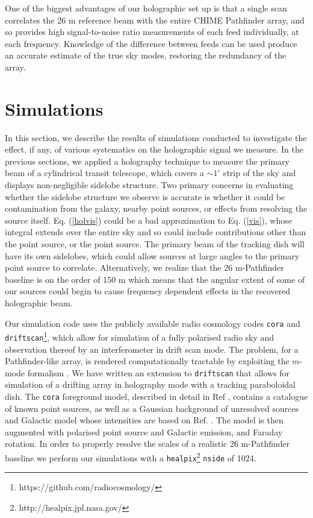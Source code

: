 One of the biggest advantages of our holographic set up is that a single scan correlates the 26 m reference beam with the entire CHIME Pathfinder array, and so provides high signal-to-noise ratio measurements of each feed individually, at each frequency. Knowledge of the difference between feeds can be used produce an accurate estimate of the true sky modes, restoring the redundancy of the array. 

\section{Simulations} \label{sec4}

In this section, we describe the results of simulations conducted to investigate the effect, if any, of various systematics on the holographic signal we measure. In the previous sections, we applied a holography technique to measure the primary beam of a cylindrical transit telescope, which covers a $\sim 1^{\circ}$ strip of the sky and displays non-negligible sidelobe structure. Two primary concerns in evaluating whether the sidelobe structure we observe is accurate is whether it could be contamination from the galaxy, nearby point sources, or effects from resolving the source itself. Eq. (\ref{holvis}) could be a bad approximation to Eq. (\ref{vis}), whose integral extends over the entire sky and so could include contributions other than the point source, or the point source. The primary beam of the tracking dish will have its own sidelobes, which could allow sources at large angles to the primary point source to correlate. Alternatively, we realize that the 26 m-Pathfinder baseline is on the order of 150 m which means that the angular extent of some of our sources could begin to cause frequency dependent effects in the recovered holographic beam. 

Our simulation code uses the publicly available radio cosmology codes \texttt{cora} and \texttt{driftscan}\footnote{https://github.com/radiocosmology/}, which allow for simulation of a fully polarised radio sky and observation thereof by an interferometer in drift scan mode. The problem, for a Pathfinder-like array, is rendered computationally tractable by exploiting the $m$-mode formalism \citep{mmodes1, mmodes2}. We have written an extension to \texttt{driftscan} that allows for simulation of a drifting array in holography mode with a tracking paraboloidal dish. The \texttt{cora} foreground model, described in detail in Ref \citep{mmodes2}, contains a catalogue of known point sources, as well as a Gaussian background of unresolved sources and Galactic model whose intensities are based on Ref. \citep{santoscoorayknox}. The model is then augmented with polarised point source and Galactic emission, and Faraday rotation. In order to properly resolve the scales of a realistic 26 m-Pathfinder baseline we perform our simulations with a \texttt{healpix}\footnote{http://healpix.jpl.nasa.gov/} \citep{gorski} \texttt{nside} of 1024.


